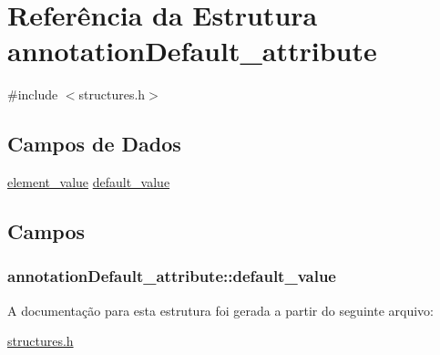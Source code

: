 \hypertarget{structannotationDefault__attribute}{}\section{Referência da Estrutura annotation\+Default\+\_\+attribute}
\label{structannotationDefault__attribute}


{\ttfamily \#include $<$structures.\+h$>$}

\subsection*{Campos de Dados}
\begin{DoxyCompactItemize}
\item 
\hyperlink{structelement__value}{element\+\_\+value} \hyperlink{structannotationDefault__attribute_a18525b7817b25760609cda9ebaadfbb3}{default\+\_\+value}
\end{DoxyCompactItemize}


\subsection{Campos}
\subsubsection[{\texorpdfstring{default\+\_\+value}{default_value}}]{ annotation\+Default\+\_\+attribute\+::default\+\_\+value}\hypertarget{structannotationDefault__attribute_a18525b7817b25760609cda9ebaadfbb3}{}\label{structannotationDefault__attribute_a18525b7817b25760609cda9ebaadfbb3}


A documentação para esta estrutura foi gerada a partir do seguinte arquivo\+:\begin{DoxyCompactItemize}
\item 
\hyperlink{structures_8h}{structures.\+h}\end{DoxyCompactItemize}
